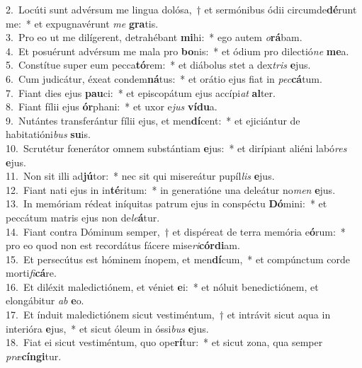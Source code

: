 {2.~}Locúti sunt advérsum me lingua dolósa,~† et sermónibus ódii circumde\textbf{dé}runt me:~* et expugnavérunt \textit{me} \textbf{gra}tis.\\
{3.~}Pro eo ut me dilígerent, detrahébant \textbf{mi}hi:~* ego autem \textit{o}\textbf{rá}bam.\\
{4.~}Et posuérunt advérsum me mala pro \textbf{bo}nis:~* et ódium pro dilectió\textit{ne} \textbf{me}a.\\
{5.~}Constítue super eum pecca\textbf{tó}rem:~* et diábolus stet a dex\textit{tris} \textbf{e}jus.\\
{6.~}Cum judicátur, éxeat condem\textbf{ná}tus:~* et orátio ejus fiat in \textit{pec}\textbf{cá}tum.\\
{7.~}Fiant dies ejus \textbf{pau}ci:~* et episcopátum ejus accípi\textit{at} \textbf{al}ter.\\
{8.~}Fiant fílii ejus \textbf{ór}phani:~* et uxor e\textit{jus} \textbf{ví}\textbf{du}a.\\
{9.~}Nutántes transferántur fílii ejus, et men\textbf{dí}cent:~* et ejiciántur de habitatióni\textit{bus} \textbf{su}is.\\
{10.~}Scrutétur fœnerátor omnem substántiam \textbf{e}jus:~* et dirípiant aliéni labó\textit{res} \textbf{e}jus.\\
{11.~}Non sit illi ad\textbf{jú}tor:~* nec sit qui misereátur pupíl\textit{lis} \textbf{e}jus.\\
{12.~}Fiant nati ejus in in\textbf{té}ritum:~* in generatióne una deleátur no\textit{men} \textbf{e}jus.\\
{13.~}In memóriam rédeat iníquitas patrum ejus in conspéctu \textbf{Dó}mini:~* et peccátum matris ejus non de\textit{le}\textbf{á}tur.\\
{14.~}Fiant contra Dóminum semper,~† et dispéreat de terra memória e\textbf{ó}rum:~* pro eo quod non est recordátus fácere mise\textit{ri}\textbf{cór}\textbf{di}am.\\
{15.~}Et persecútus est hóminem ínopem, et men\textbf{dí}cum,~* et compúnctum corde morti\textit{fi}\textbf{cá}re.\\
{16.~}Et diléxit maledictiónem, et véniet \textbf{e}i:~* et nóluit benedictiónem, et elongábitur \textit{ab} \textbf{e}o.\\
{17.~}Et índuit maledictiónem sicut vestiméntum,~† et intrávit sicut aqua in interióra \textbf{e}jus,~* et sicut óleum in óssi\textit{bus} \textbf{e}jus.\\
{18.~}Fiat ei sicut vestiméntum, quo ope\textbf{rí}tur:~* et sicut zona, qua semper \textit{præ}\textbf{cín}\textbf{gi}tur.\\
